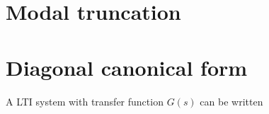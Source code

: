 \section{Modal truncation}
\section{Diagonal canonical form}
A LTI system with transfer function \(G(s)\) can be written 